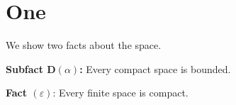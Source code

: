 \documentclass{article}
\newcommand{\eps}{\varepsilon}
\begin{document}
\section{One}
We show two facts about the space.

\textbf{Subfact D$(\alpha)$:} Every compact space is bounded.

\textbf{Fact $(\eps)$}: Every finite space is compact.
\end{document}
